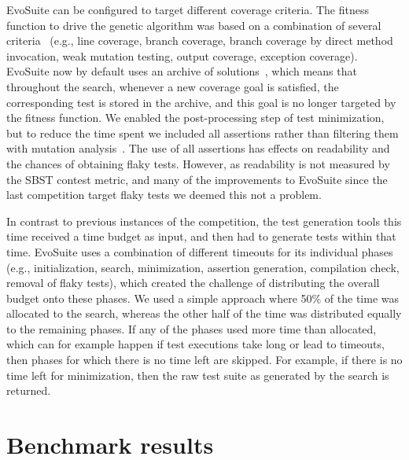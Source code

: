 \documentclass[10pt,conference,compsocconf]{IEEEtran}
\newcommand{\EVOSUITE}{{\sc EvoSuite}\xspace}
\begin{document}
\EVOSUITE can be configured to target different coverage criteria. The
fitness function to drive the genetic algorithm was based on a
combination of several criteria~\cite{rojas2015combining} (e.g., line
coverage, branch coverage, branch coverage by direct method
invocation, weak mutation testing, output coverage, exception
coverage). \EVOSUITE now by default uses an archive of
solutions~\cite{emse_archive}, which means that throughout the search,
whenever a new coverage goal is satisfied, the corresponding test is
stored in the archive, and this goal is no longer targeted by the
fitness function. We enabled the post-processing step of test
minimization, but to reduce the time spent we included all assertions
rather than filtering them with mutation
analysis~\cite{10.1109/TSE.2011.93}. The use of all assertions has
effects on readability and the chances of obtaining flaky
tests. However, as readability is not measured by the SBST contest
metric, and many of the improvements to \EVOSUITE since the last
competition target flaky tests we deemed this not a problem.

In contrast to previous instances of the competition, the test
generation tools this time received a time budget as input, and then
had to generate tests within that time. \EVOSUITE uses a combination
of different timeouts for its individual phases (e.g., initialization,
search, minimization, assertion generation, compilation check, removal
of flaky tests), which created the challenge of distributing the
overall budget onto these phases. We used a simple approach where 50\%
of the time was allocated to the search, whereas the other half of the
time was distributed equally to the remaining phases. If any of the
phases used more time than allocated, which can for example happen if
test executions take long or lead to timeouts, then phases for which
there is no time left are skipped. For example, if there is no time
left for minimization, then the raw test suite as generated by the
search is returned.

\section{Benchmark results}

\begin{table*}[t]
  \centering
  \caption{\label{table:results}Detailed results of \EVOSUITE on the SBST benchmark classes.}
\resizebox{0.9\textwidth}{!}{  

}	
\end{table*}
\end{document}
